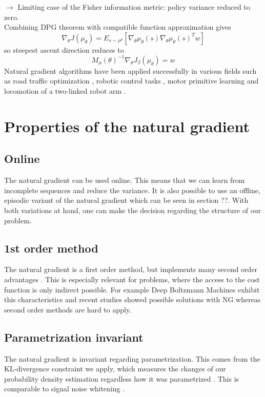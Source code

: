 $\rightarrow$ Limiting case of the Fisher information metric: policy variance reduced to zero.\\
Combining DPG theorem with compatible function approximation gives 
\begin{equation}
\nabla_{\theta}J(\mu_{\theta}) = E_{s\sim\rho^{\mu}}[\nabla_{\theta} \mu_{\theta}(s) \nabla_{\theta} \mu_{\theta}(s)^{T}w]
\end{equation} 
so steepest ascent direction reduces to
\begin{equation}
M_{\mu}(\theta)^{-1}\nabla_{\theta}J_{\beta}(\mu_{\theta})=w
\end{equation} 
Natural gradient algorithms have been applied successfully in various fields such as road traffic optimization \cite{richter2007natural}, robotic control tasks \cite{kim2010impedance}, motor primitive learning \cite{peters2007applying} and locomotion of a two-linked robot arm \cite{park2005rls}.
\section{Properties of the natural gradient}

\subsection{Online}
The natural gradient can be used online. This means that we can learn from incomplete sequences and reduce the variance. It is also possible to use an offline, episodic variant of the natural gradient which can be seen in section ??. With both variations at hand, one can make the decision regarding the structure of our problem. \cite{pascanu2013revisiting, peters2008natural}

\subsection{1st order method}
The natural gradient is a first order method, but implements many second order advantages \cite{pascanu2013revisiting}. This is especially relevant for problems,  where the access to the cost function is only indirect possible. For example Deep Boltzmann Machines exhibit this characteristics and recent studies showed possible solutions with NG \cite{desjardins2013metric} whereas second order  methods are hard to apply.

\subsection{Parametrization invariant}
The natural gradient is invariant regarding parametrization. This comes from the KL-divergence constraint we apply, which measures the changes of our probability density estimation regardless how it was parametrized \cite{pascanu2013revisiting}. This is comparable to signal noise whitening \cite{sohl2012natural}.

